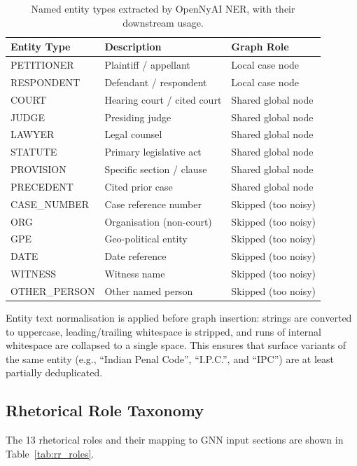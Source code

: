 \documentclass[12pt,a4paper]{report}
\begin{document}
\begin{table}[H]
  \centering
  \caption{Named entity types extracted by OpenNyAI NER, with their downstream usage.}
  \label{tab:ner_types}
  \begin{tabular}{lll}
    \toprule
    \textbf{Entity Type} & \textbf{Description} & \textbf{Graph Role} \\
    \midrule
    PETITIONER & Plaintiff / appellant & Local case node \\
    RESPONDENT & Defendant / respondent & Local case node \\
    COURT & Hearing court / cited court & Shared global node \\
    JUDGE & Presiding judge & Shared global node \\
    LAWYER & Legal counsel & Shared global node \\
    STATUTE & Primary legislative act & Shared global node \\
    PROVISION & Specific section / clause & Shared global node \\
    PRECEDENT & Cited prior case & Shared global node \\
    CASE\_NUMBER & Case reference number & Skipped (too noisy) \\
    ORG & Organisation (non-court) & Skipped (too noisy) \\
    GPE & Geo-political entity & Skipped (too noisy) \\
    DATE & Date reference & Skipped (too noisy) \\
    WITNESS & Witness name & Skipped (too noisy) \\
    OTHER\_PERSON & Other named person & Skipped (too noisy) \\
    \bottomrule
  \end{tabular}
\end{table}

Entity text normalisation is applied before graph insertion: strings are converted to uppercase, leading/trailing whitespace is stripped, and runs of internal whitespace are collapsed to a single space. This ensures that surface variants of the same entity (e.g., ``Indian Penal Code'', ``I.P.C.'', and ``IPC'') are at least partially deduplicated.

\subsection{Rhetorical Role Taxonomy}

The 13 rhetorical roles and their mapping to GNN input sections are shown in Table~\ref{tab:rr_roles}.
\end{document}
